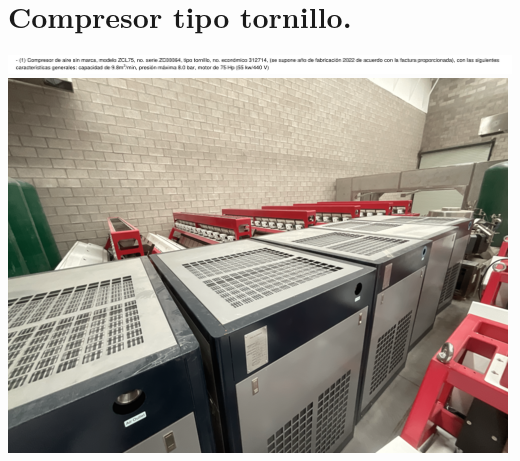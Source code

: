 \documentclass{article}
\begin{document}

\section{Compresor tipo tornillo.} %
\includegraphics[width=  \linewidth]{images/decript/11.png}
\includegraphics[width=  .5\linewidth]{images/foto/11.png}


\end{document}
